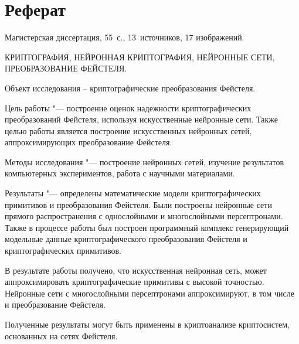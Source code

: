 \chapter*{Реферат}

Магистерская диссертация, 55 с., 13 источников, 17 изображений.
\bigskip

КРИПТОГРАФИЯ, НЕЙРОННАЯ КРИПТОГРАФИЯ, НЕЙРОННЫЕ СЕТИ, ПРЕОБРАЗОВАНИЕ ФЕЙСТЕЛЯ.
\bigskip

Объект исследования – криптографические преобразования Фейстеля.
\bigskip

Цель работы "--- построение оценок надежности криптографических преобразований Фейстеля, используя искусственные нейронные сети.
Также целью работы является построение искусственных нейронных сетей, аппроксимирующих преобразование Фейстеля.
\bigskip

Методы исследования "--- построение нейронных сетей, изучение результатов компьютерных экспериментов, работа с научными материалами.
\bigskip

Результаты "--- определены математические модели криптографических примитивов и преобразования Фейстеля. Были построены нейронные сети прямого распространения с однослойными и многослойными персептронами. Также в процессе работы был построен программный комплекс генерирующий модельные данные криптографического преобразования Фейстеля и криптографических примитивов.
\bigskip

В результате работы получено, что искусственная нейронная сеть, может аппроксимировать криптографические примитивы с высокой точностью.
Нейронные сети с многослойными персептронами аппроксимируют, в том числе и преобразование Фейстеля.

\bigskip
Полученные результаты могут быть применены в криптоанализе криптосистем, основанных на сетях Фейстеля.